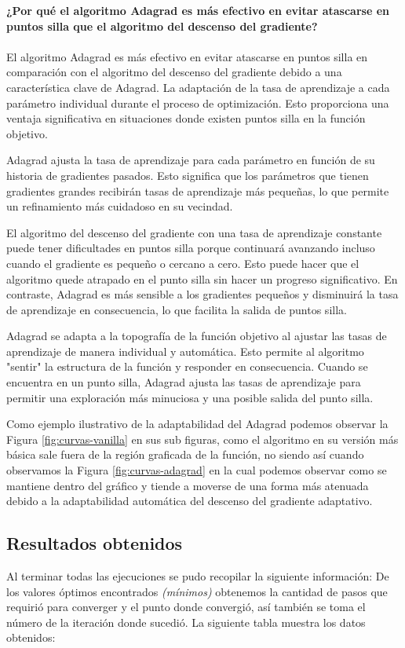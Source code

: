 \textbf{¿Por qué el algoritmo Adagrad es más efectivo en evitar atascarse en
puntos silla que el algoritmo del descenso del gradiente?}
\\
\\
El algoritmo Adagrad es más efectivo en evitar atascarse en puntos silla en comparación con el algoritmo del descenso del gradiente debido a una característica clave de Adagrad. La adaptación de la tasa de aprendizaje a cada parámetro individual durante el proceso de optimización. Esto proporciona una ventaja significativa en situaciones donde existen puntos silla en la función objetivo.

Adagrad ajusta la tasa de aprendizaje para cada parámetro en función de su historia de gradientes pasados. Esto significa que los parámetros que tienen gradientes grandes recibirán tasas de aprendizaje más pequeñas, lo que permite un refinamiento más cuidadoso en su vecindad.

El algoritmo del descenso del gradiente con una tasa de aprendizaje constante puede tener dificultades en puntos silla porque continuará avanzando incluso cuando el gradiente es pequeño o cercano a cero. Esto puede hacer que el algoritmo quede atrapado en el punto silla sin hacer un progreso significativo. En contraste, Adagrad es más sensible a los gradientes pequeños y disminuirá la tasa de aprendizaje en consecuencia, lo que facilita la salida de puntos silla.

Adagrad se adapta a la topografía de la función objetivo al ajustar las tasas de aprendizaje de manera individual y automática. Esto permite al algoritmo "sentir" la estructura de la función y responder en consecuencia. Cuando se encuentra en un punto silla, Adagrad ajusta las tasas de aprendizaje para permitir una exploración más minuciosa y una posible salida del punto silla.

Como ejemplo ilustrativo de la adaptabilidad del Adagrad podemos observar la Figura \ref{fig:curvas-vanilla} en sus sub figuras, como el algoritmo en su versión más básica sale fuera de la región graficada de la función, no siendo así cuando observamos la Figura \ref{fig:curvas-adagrad} en la cual podemos observar como se mantiene dentro del gráfico y tiende a moverse de una forma más atenuada debido a la adaptabilidad automática del descenso del gradiente adaptativo. 

\newpage
\subsection{Resultados obtenidos}
Al terminar todas las ejecuciones se pudo recopilar la siguiente información: De los valores óptimos encontrados \textit{(mínimos)} obtenemos la cantidad de pasos que requirió para converger y el punto donde convergió, así también se toma el número de la iteración donde sucedió. La siguiente tabla muestra los datos obtenidos: \\


